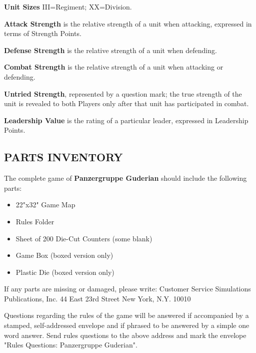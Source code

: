 \textbf{Unit Sizes}
III=Regiment; XX=Division.

\textbf{Attack Strength} is the relative strength of a unit when attacking, expressed in terms of Strength Points.

\textbf{Defense Strength} is the relative strength of a unit when defending.

\textbf{Combat Strength} is the relative strength of a unit when attacking or defending.

\textbf{Untried Strength}, represented by a question mark; the true strength of the unit is revealed to both Players only after that unit has participated in combat.

\textbf{Leadership Value} is the rating of a particular leader, expressed in Leadership Points.

\subsection{PARTS INVENTORY}

The complete game of \textbf{Panzergruppe Guderian} should include the following parts:

\begin{itemize}
  \setlength\itemsep{-1em}
  \item 22"x32" Game Map
  \item Rules Folder
  \item Sheet of 200 Die-Cut Counters (some blank)
  \item Game Box (boxed version only)
  \item Plastic Die (boxed version only)
\end{itemize}

If any parts are missing or damaged, please write:
Customer Service
Simulations Publications, Inc.
44 East 23rd Street
New York, N.Y. 10010

Questions regarding the rules of the game will be answered if accompanied by a stamped, self-addressed envelope and if phrased to be answered by a simple one word answer. Send rules questions to the above address and mark the envelope "Rules Questions: Panzergruppe Guderian".